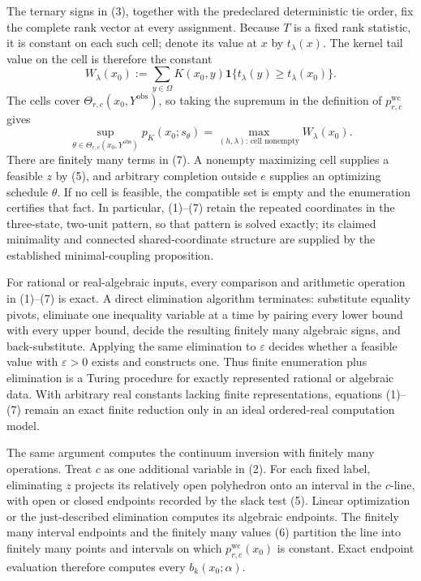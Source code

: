 The ternary signs in (3), together with the predeclared deterministic tie order, fix the complete rank vector at every assignment.  Because \(T\) is a fixed rank statistic, it is constant on each such cell; denote its value at \(x\) by \(t_\lambda(x)\).  The kernel tail value on the cell is therefore the constant
\[
W_\lambda(x_0)
:=\sum_{y\in\Omega}K(x_0,y)
\mathbf 1\{t_\lambda(y)\geq t_\lambda(x_0)\}.
\tag{6}
\]
The cells cover \(\Theta_{r,c}(x_0,Y^{\mathrm{obs}})\), so taking the supremum in the definition of \(p^{\mathrm{wc}}_{r,c}\) gives
\[
\sup_{\theta\in\Theta_{r,c}(x_0,Y^{\mathrm{obs}})}p_K(x_0;s_\theta)
=\max_{(h,\lambda):\,\text{cell nonempty}}W_\lambda(x_0).
\tag{7}
\]
There are finitely many terms in (7).  A nonempty maximizing cell supplies a feasible \(z\) by (5), and arbitrary completion outside \(e\) supplies an optimizing schedule \(\theta\).  If no cell is feasible, the compatible set is empty and the enumeration certifies that fact.  In particular, (1)--(7) retain the repeated coordinates in the three-state, two-unit pattern, so that pattern is solved exactly; its claimed minimality and connected shared-coordinate structure are supplied by the established minimal-coupling proposition.

For rational or real-algebraic inputs, every comparison and arithmetic operation in (1)--(7) is exact.  A direct elimination algorithm terminates: substitute equality pivots, eliminate one inequality variable at a time by pairing every lower bound with every upper bound, decide the resulting finitely many algebraic signs, and back-substitute.  Applying the same elimination to \(\varepsilon\) decides whether a feasible value with \(\varepsilon>0\) exists and constructs one.  Thus finite enumeration plus elimination is a Turing procedure for exactly represented rational or algebraic data.  With arbitrary real constants lacking finite representations, equations (1)--(7) remain an exact finite reduction only in an ideal ordered-real computation model.

The same argument computes the continuum inversion with finitely many operations.  Treat \(c\) as one additional variable in (2).  For each fixed label, eliminating \(z\) projects its relatively open polyhedron onto an interval in the \(c\)-line, with open or closed endpoints recorded by the slack test (5).  Linear optimization or the just-described elimination computes its algebraic endpoints.  The finitely many interval endpoints and the finitely many values (6) partition the line into finitely many points and intervals on which \(p^{\mathrm{wc}}_{r,c}(x_0)\) is constant.  Exact endpoint evaluation therefore computes every \(b_k(x_0;\alpha)\).

